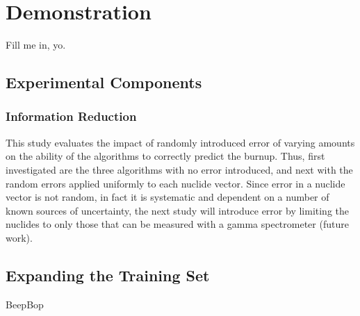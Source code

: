\chapter{Demonstration}
\label{ch:demo}

Fill me in, yo.

\section{Experimental Components}







\subsection{Information Reduction}

This study evaluates the impact of randomly introduced error of varying amounts
on the ability of the algorithms to correctly predict the burnup. Thus, first
investigated are the three algorithms with no error introduced, and next with
the random errors applied uniformly to each nuclide vector. Since error in a
nuclide vector is not random, in fact it is systematic and dependent on a
number of known sources of uncertainty, the next study will introduce error by
limiting the nuclides to only those that can be measured with a gamma
spectrometer (future work).

\section{Expanding the Training Set}
\label{sec:newtrain}

BeepBop
